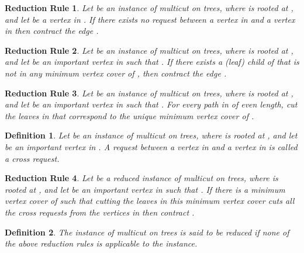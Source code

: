 \documentclass[11pt]{article}
\newtheorem{reduction}{Reduction Rule}[section]
\newtheorem{definition}{Definition}[section]
\begin{document}
\begin{reduction}\label{red:3}
Let  be an instance of {\sc multicut on trees}, where  is rooted at , and let  be a vertex in .  If there exists no request between a vertex in  and a vertex in  then contract the edge .
\end{reduction}



\begin{reduction}\label{red:4}
Let  be an instance of {\sc multicut on trees}, where  is rooted at , and let  be an important vertex in  such that . If there exists a (leaf) child  of  that is not in any minimum vertex cover of , then contract the edge .
\end{reduction}


\begin{reduction}\label{red:5}
Let  be an instance of {\sc multicut on trees}, where  is rooted at , and let  be an important vertex in  such that . For every path in  of even length, cut the leaves in  that correspond to the unique minimum vertex cover of .
\end{reduction}


\begin{definition} \rm
Let  be an instance of {\sc multicut on trees}, where  is rooted at , and let  be an important vertex in . A request between a vertex in  and a vertex in  is called a {\em cross request}.
\end{definition}


\begin{reduction}\label{red:6}
Let  be a reduced instance of {\sc multicut on trees}, where  is rooted at , and let  be an important vertex in  such that . If there is a minimum vertex cover of  such that cutting the leaves in this minimum vertex cover cuts all the cross requests from the vertices in  then contract .
\end{reduction}


\begin{definition}\rm
\label{def:strongreduced}
The instance  of {\sc multicut on trees} is said to be {\em reduced} if none of the above reduction rules is applicable to the instance.
\end{definition}
\end{document}
